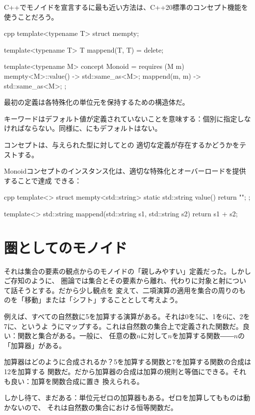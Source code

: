 C++でモノイドを宣言するに最も近い方法は、C++20標準のコンセプト機能を使うことだろう。

\begin{snip}{cpp}
template<typename T>
struct mempty;

template<typename T>
T mappend(T, T) = delete;

template<typename M>
concept Monoid = requires (M m) {
    { mempty<M>::value() } -> std::same_as<M>;
    { mappend(m, m) } -> std::same_as<M>;
};
\end{snip}
最初の定義は各特殊化の単位元を保持するための構造体だ。

キーワードはデフォルト値が定義されていないことを意味する：個別に指定しな
ければならない。同様に、にもデフォルトはない。

コンセプトは、与えられた型に対してとの
適切な定義が存在するかどうかをテストする。

Monoidコンセプトのインスタンス化は、適切な特殊化とオーバーロードを提供することで達成
できる：

\begin{snip}{cpp}
template<>
struct mempty<std::string> {
    static std::string value() { return ""; }
};

template<>
std::string mappend(std::string s1, std::string s2) {
    return s1 + s2;
}
\end{snip}

\section{圏としてのモノイド}

それは集合の要素の観点からのモノイドの「親しみやすい」定義だった。しかしご存知のように、
圏論では集合とその要素から離れ、代わりに対象と射について話そうとする。だから少し観点を
変えて、二項演算の適用を集合の周りのものを「移動」または「シフト」することとして考えよう。

例えば、すべての自然数に5を加算する演算がある。それは0を5に、1を6に、2を7に、というよ
うにマップする。これは自然数の集合上で定義された関数だ。良い：関数と集合がある。一般に、
任意の数$n$に対して$n$を加算する関数――$n$の「加算器」がある。

加算器はどのように合成されるか？5を加算する関数と7を加算する関数の合成は12を加算する
関数だ。だから加算器の合成は加算の規則と等価にできる。それも良い：加算を関数合成に置き
換えられる。

しかし待て、まだある：単位元ゼロの加算器もある。ゼロを加算してもものは動かないので、
それは自然数の集合における恒等関数だ。

